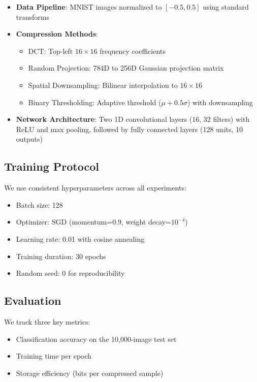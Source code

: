 \documentclass{article} %
\begin{document}
\begin{itemize}
    \item \textbf{Data Pipeline}: MNIST images normalized to $[-0.5, 0.5]$ using standard transforms
    \item \textbf{Compression Methods}: 
        \begin{itemize}
            \item DCT: Top-left $16 \times 16$ frequency coefficients
            \item Random Projection: 784D to 256D Gaussian projection matrix
            \item Spatial Downsampling: Bilinear interpolation to $16 \times 16$
            \item Binary Thresholding: Adaptive threshold ($\mu + 0.5\sigma$) with downsampling
        \end{itemize}
    \item \textbf{Network Architecture}: Two 1D convolutional layers (16, 32 filters) with ReLU and max pooling, followed by fully connected layers (128 units, 10 outputs)
\end{itemize}

\subsection{Training Protocol}
We use consistent hyperparameters across all experiments:
\begin{itemize}
    \item Batch size: 128
    \item Optimizer: SGD (momentum=0.9, weight decay=$10^{-4}$)
    \item Learning rate: 0.01 with cosine annealing
    \item Training duration: 30 epochs
    \item Random seed: 0 for reproducibility
\end{itemize}

\subsection{Evaluation}
We track three key metrics:
\begin{itemize}
    \item Classification accuracy on the 10,000-image test set
    \item Training time per epoch
    \item Storage efficiency (bits per compressed sample)
\end{itemize}
\end{document}
